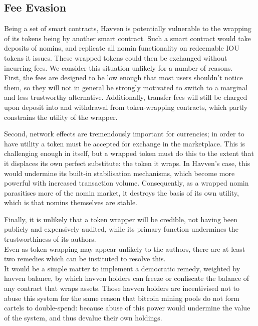 \newpage

\subsection{Fee Evasion}

\noindent Being a set of smart contracts, Havven is potentially
vulnerable to the wrapping of its tokens being by another smart contract.
Such a smart contract would take deposits of nomins, and replicate
all nomin functionality on redeemable IOU tokens it issues.
These wrapped tokens could then be exchanged without incurring fees.
We consider this situation unlikely for a number of reasons. \\

\noindent First, the fees are designed to be low enough that most users
shouldn't notice them, so they will not in general be strongly motivated to
switch to a marginal and less trustworthy alternative. Additionally, transfer
fees will still be charged upon deposit into and withdrawal from
token-wrapping contracts, which partly constrains the utility of the wrapper.

\noindent Second, network effects are tremendously important for currencies;
in order to have utility a token must be accepted for exchange in the
marketplace. This is challenging enough in itself, but a wrapped token must
do this to the extent that it displaces its own perfect substitute: the token
it wraps.
In Havven's case, this would undermine its built-in
stabilisation mechanisms, which become more powerful with increased
transaction volume. Consequently, as a wrapped nomin parasitises more of the
nomin market, it destroys the basis of its own utility, which is that nomins
themselves are stable.

\noindent Finally, it is unlikely that a token wrapper will be credible, not
having been publicly and expensively audited, while its primary function
undermines the trustworthiness of its authors. \\

\noindent Even as token wrapping may appear unlikely to the authors, there
are at least two remedies which can be instituted to resolve this. \\

\noindent It would be a simple matter to implement a democratic remedy,
weighted by havven balance, by which havven holders can freeze or confiscate the
balance of any contract that wraps assets. Those havven holders are
incentivised not to abuse this system for the same reason that bitcoin
mining pools do not form cartels to double-spend: because abuse of this
power would undermine the value of the system, and thus devalue their
own holdings.

